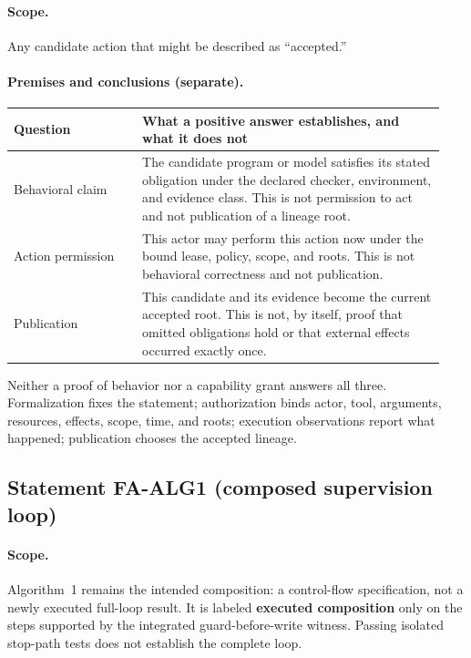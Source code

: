 \paragraph{Scope.}
Any candidate action that might be described as ``accepted.''

\paragraph{Premises and conclusions (separate).}
\begin{center}
\begin{tabular}{@{}p{0.28\linewidth}p{0.66\linewidth}@{}}
\toprule
Question & What a positive answer establishes, and what it does not \\
\midrule
Behavioral claim &
The candidate program or model satisfies its stated obligation under the
declared checker, environment, and evidence class. This is not permission to
act and not publication of a lineage root. \\
Action permission &
This actor may perform this action now under the bound lease, policy, scope,
and roots. This is not behavioral correctness and not publication. \\
Publication &
This candidate and its evidence become the current accepted root. This is not,
by itself, proof that omitted obligations hold or that external effects
occurred exactly once. \\
\bottomrule
\end{tabular}
\end{center}

Neither a proof of behavior nor a capability grant answers all three. Formalization
fixes the statement; authorization binds actor, tool, arguments, resources,
effects, scope, time, and roots; execution observations report what happened;
publication chooses the accepted lineage.

\subsection*{Statement FA-ALG1 (composed supervision loop)}
\label{stmt:fa-alg1}

\paragraph{Scope.}
Algorithm~1 remains the intended composition: a control-flow specification,
not a newly executed full-loop result. It is labeled \textbf{executed
composition} only on the steps supported by the integrated guard-before-write
witness. Passing isolated stop-path tests does
not establish the complete loop.

